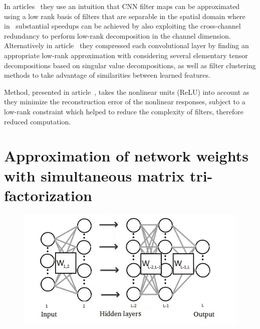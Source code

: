 \documentclass{article} %
\begin{document}
In articles~\cite{jaderberg2014speeding, rigamonti2013learning} they use an
intuition that CNN filter maps can be approximated using a low rank basis of
filters that are separable in the spatial domain where 
in~\cite{jaderberg2014speeding}
substantial speedups can be achieved by also exploiting the cross-channel 
redundancy to perform low-rank decomposition in the
channel dimension. 
Alternatively in article~\cite{denton2014exploiting} they compressed each 
convolutional layer by finding an appropriate low-rank approximation with 
considering several elementary tensor decompositions based on singular value 
decompositions, as well as filter clustering methods to take advantage of 
similarities between learned features.

Method, presented in article~\cite{zhang2015efficient}, takes the nonlinear 
units (ReLU) into account as they minimize the reconstruction error of the 
nonlinear responses, subject to a low-rank constraint which helped to reduce the 
complexity of filters, therefore reduced computation. 






\section{Approximation of network weights with simultaneous matrix
tri-factorization}

\begin{figure}[!ht]
\centering
\includegraphics[width=.8\linewidth]{globokamreza2.jpg}



\label{f:globokamreza}

\end{figure}
\end{document}
